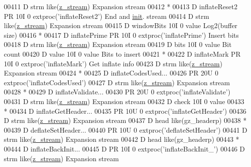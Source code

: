 \begin{DoxyCode}
00411      D  strm                               like(\hyperlink{structz__stream__s}{z\_stream})                       Expansion stream
00412       *
00413      D inflateReset2   PR            10I 0 extproc('inflateReset2')             End and 
      \hyperlink{structinit}{init}. stream
00414      D  strm                               like(\hyperlink{structz__stream__s}{z\_stream})                       Expansion stream
00415      D  windowBits                   10I 0 value                                Log2(buffer size)
00416       *
00417      D inflatePrime    PR            10I 0 extproc('inflatePrime')              Insert bits
00418      D  strm                               like(\hyperlink{structz__stream__s}{z\_stream})                       Expansion stream
00419      D  bits                         10I 0 value                                Bit count
00420      D  value                        10I 0 value                                Bits to insert
00421       *
00422      D inflateMark     PR            10I 0 extproc('inflateMark')               Get inflate info
00423      D  strm                               like(\hyperlink{structz__stream__s}{z\_stream})                       Expansion stream
00424       *
00425      D inflateCodesUsed...
00426                        PR            20U 0 extproc('inflateCodesUsed')
00427      D  strm                               like(\hyperlink{structz__stream__s}{z\_stream})                       Expansion stream
00428       *
00429      D inflateValidate...
00430                        PR            20U 0 extproc('inflateValidate')
00431      D  strm                               like(\hyperlink{structz__stream__s}{z\_stream})                       Expansion stream
00432      D  check                        10I 0 value
00433       *
00434      D inflateGetHeader...
00435                        PR            10U 0 extproc('inflateGetHeader')
00436      D  strm                               like(\hyperlink{structz__stream__s}{z\_stream})                       Expansion stream
00437      D  head                               like(gz\_headerp)
00438       *
00439      D deflateSetHeader...
00440                        PR            10U 0 extproc('deflateSetHeader')
00441      D  strm                               like(\hyperlink{structz__stream__s}{z\_stream})                       Expansion stream
00442      D  head                               like(gz\_headerp)
00443       *
00444      D inflateBackInit...
00445      D                 PR            10I 0 extproc('inflateBackInit\_')
00446      D  strm                               like(\hyperlink{structz__stream__s}{z\_stream})                       Expansion stream

\end{DoxyCode}
